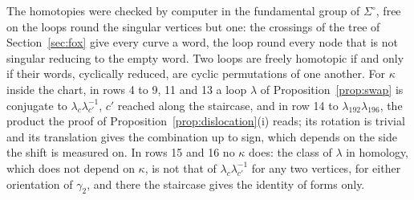 \documentclass[11pt,a4paper]{article}
\begin{document}
The homotopies were checked by computer in the fundamental group of
$\Sigma^\circ$, free on the loops round the singular vertices but one: the
crossings of the tree of Section~\ref{sec:fox} give every curve a word, the
loop round every node that is not singular reducing to the empty word. Two loops are freely
homotopic if and only if their words, cyclically reduced, are cyclic
permutations of one another. For $\kappa$ inside the chart, in rows 4 to 9, 11
and 13 a loop $\lambda$ of Proposition~\ref{prop:swap} is conjugate to
$\lambda_c \lambda_{c'}^{-1}$, $c'$ reached along the staircase, and in row 14
to $\lambda_{192} \lambda_{196}$, the product the proof of
Proposition~\ref{prop:dislocation}(i) reads; its rotation is trivial and its
translation gives the combination up to sign, which depends on the side the
shift is measured on. In rows 15 and 16 no $\kappa$ does: the
class of $\lambda$ in homology, which does not depend on $\kappa$, is not that
of $\lambda_c \lambda_{c'}^{-1}$ for any two vertices, for either orientation of $\gamma_2$, and there the staircase
gives the identity of forms only.
\end{document}
